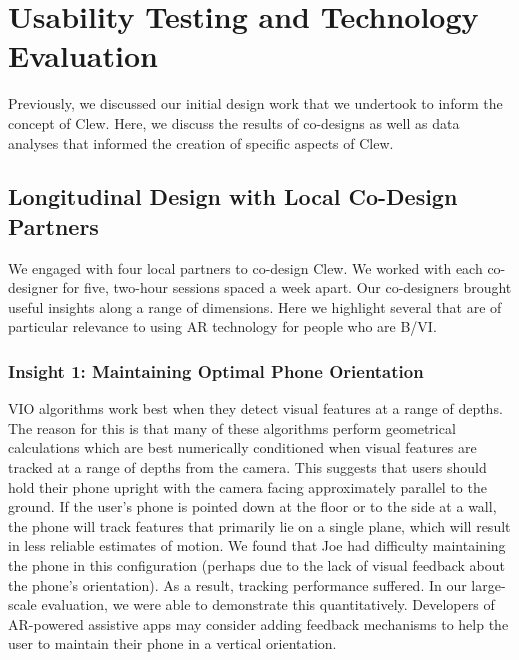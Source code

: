 \documentclass[chi_draft]{sigchi}
\newcommand{\BVI}{B/VI\xspace}
\begin{document}
\section{Usability Testing and Technology Evaluation}\label{sec:usabilityandevaluation}
Previously, we discussed our initial design work that we undertook to inform the concept of Clew.  Here, we discuss the results of co-designs as well as data analyses that informed the creation of specific aspects of Clew. %

\subsection{Longitudinal Design with Local Co-Design Partners}
We engaged with four local partners to co-design Clew.  We worked with each co-designer for five, two-hour sessions spaced a week apart.  Our co-designers brought useful insights along a range of dimensions.  Here we highlight several that are of particular relevance to using AR technology for people who are \BVI.

\subsubsection{Insight 1: Maintaining Optimal Phone Orientation}
VIO algorithms work best when they detect visual features at a range of depths.  The reason for this is that many of these algorithms perform geometrical calculations which are best numerically conditioned when visual features are tracked at a range of depths from the camera.  This suggests that users should hold their phone upright with the camera facing approximately parallel to the ground.  If the user's phone is pointed down at the floor or to the side at a wall, the phone will track features that primarily lie on a single plane, which will result in less reliable estimates of motion.  We found that Joe had difficulty maintaining the phone in this configuration (perhaps due to the lack of visual feedback about the phone's orientation).  As a result, tracking performance suffered.  In our large-scale evaluation, we were able to demonstrate this quantitatively.  Developers of AR-powered assistive apps may consider adding feedback mechanisms to help the user to maintain their phone in a vertical orientation.
\end{document}
